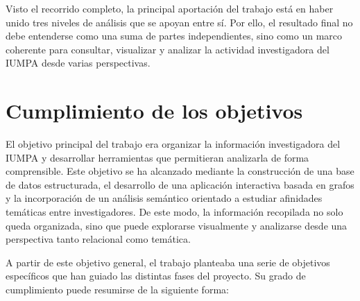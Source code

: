 \documentclass[11pt,spanish,listoffigures,listoftables]{tfgetsinf}
\begin{document}
Visto el recorrido completo, la principal aportación del trabajo está en haber unido tres niveles de análisis que se apoyan entre sí. Por ello, el resultado final no debe entenderse como una suma de partes independientes, sino como un marco coherente para consultar, visualizar y analizar la actividad investigadora del IUMPA desde varias perspectivas.

\section{Cumplimiento de los objetivos}

El objetivo principal del trabajo era organizar la información investigadora del IUMPA y desarrollar herramientas que permitieran analizarla de forma comprensible. Este objetivo se ha alcanzado mediante la construcción de una base de datos estructurada, el desarrollo de una aplicación interactiva basada en grafos y la incorporación de un análisis semántico orientado a estudiar afinidades temáticas entre investigadores. De este modo, la información recopilada no solo queda organizada, sino que puede explorarse visualmente y analizarse desde una perspectiva tanto relacional como temática.

A partir de este objetivo general, el trabajo planteaba una serie de objetivos específicos que han guiado las distintas fases del proyecto. Su grado de cumplimiento puede resumirse de la siguiente forma:
\end{document}
